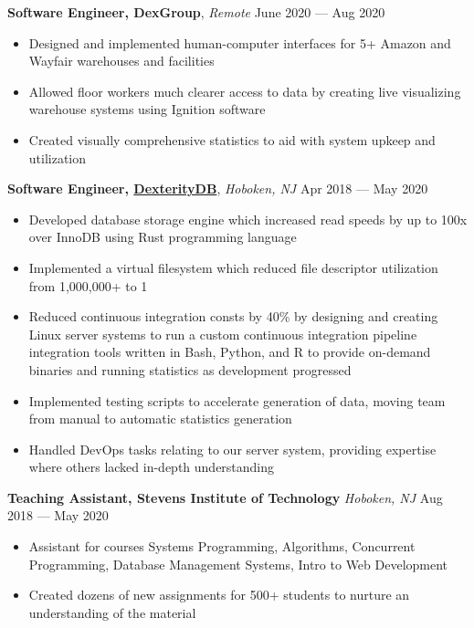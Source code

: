 \documentclass[10pt,letterpaper,roman]{moderncv}
\begin{document}
\hfill

\textbf{Software Engineer, DexGroup}, \textit{Remote} \hfill June 2020 --- Aug 2020
\begin{itemize}
\item Designed and implemented human-computer interfaces for 5+ Amazon and Wayfair warehouses
  and facilities
\item Allowed floor workers much clearer access to data by creating live
  visualizing warehouse systems using Ignition software
\item Created visually comprehensive statistics to aid with system upkeep and
  utilization
\end{itemize}\space

\hfill

\textbf{Software Engineer, \href{https://dexteritydb.com}{DexterityDB}},
\textit{Hoboken, NJ} \hfill Apr 2018 --- May 2020
\begin{itemize}
\item Developed database storage engine which increased read speeds by up to 100x over InnoDB using Rust programming language
\item Implemented a virtual filesystem which reduced file descriptor utilization
  from 1,000,000+ to 1
\item Reduced continuous integration consts by 40\% by designing and creating
  Linux server systems to run a custom continuous integration pipeline
  integration tools written in Bash, Python, and R to provide on-demand binaries
  and running statistics as development progressed
\item Implemented testing scripts to accelerate generation of data, moving team from manual to automatic statistics generation
\item Handled DevOps tasks relating to our server system, providing expertise
  where others lacked in-depth understanding
\end{itemize}\space

\hfill

\textbf{Teaching Assistant, Stevens Institute of Technology} \textit{Hoboken,
  NJ} \hfill Aug 2018 --- May 2020
\begin{itemize}
\item Assistant for courses Systems Programming, Algorithms, Concurrent
  Programming, Database Management Systems, Intro to Web Development
\item Created dozens of new assignments for 500+ students to nurture an
  understanding of the material
\end{itemize}
\end{document}
